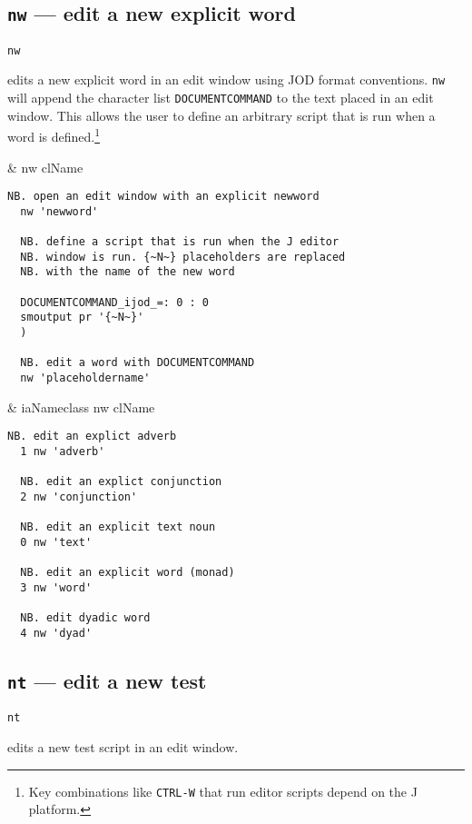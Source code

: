 \subsection{\texttt{nw} --- edit a new explicit word}\label{ss:nw} 

\hypertarget{il:nw}{\texttt{nw}} edits a new explicit word in 
an edit window using JOD format conventions.  \texttt{nw} will append the 
character list \texttt{DOCUMENTCOMMAND} to the text placed in an edit window.  
This allows the user to define an arbitrary script that is run when a word is defined.\footnote{
Key combinations like \texttt{CTRL-W} that run editor scripts depend on the J platform.
}

\begin{wordhead}
\monad & nw clName \\
\end{wordhead}
\begin{lstlisting}[frame=single,framerule=0pt] 
  NB. open an edit window with an explicit newword
  nw 'newword'  

  NB. define a script that is run when the J editor
  NB. window is run. {~N~} placeholders are replaced
  NB. with the name of the new word

  DOCUMENTCOMMAND_ijod_=: 0 : 0
  smoutput pr '{~N~}'
  )

  NB. edit a word with DOCUMENTCOMMAND
  nw 'placeholdername'
\end{lstlisting}

\begin{wordhead}
\dyad & iaNameclass nw clName \\
\end{wordhead}
\begin{lstlisting}[frame=single,framerule=0pt]
  NB. edit an explict adverb
  1 nw 'adverb'   

  NB. edit an explict conjunction
  2 nw 'conjunction'  

  NB. edit an explicit text noun
  0 nw 'text'  

  NB. edit an explicit word (monad)
  3 nw 'word'  

  NB. edit dyadic word
  4 nw 'dyad'  
\end{lstlisting}

\subsection{\texttt{nt} --- edit a new test}\label{ss:nt}

\hypertarget{il:nt}{\texttt{nt}} edits a new test script in an edit window. 

